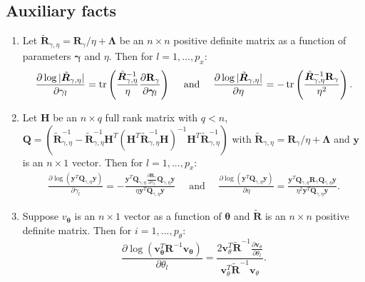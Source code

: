 \subsection{Auxiliary facts}
\begin{enumerate}[1.]
\item Let $\tilde {\bm R}_{\gamma,\eta}=\mathbf R_{\gamma}/\eta+ \bm \Lambda$ be an $n\times n$ positive definite matrix as a function of parameters $\bm \gamma$ and $\eta$.
 Then for $l=1,...,p_x$: 
\begin{align*}
\frac{\partial \log |\tilde {\bm R}_{\gamma,\eta} | }{\partial  \gamma_l}=\tr\left( \frac{\tilde {\bm R}_{\gamma,\eta}^{-1}}{\eta} \frac{\partial \mathbf R_\gamma}{\partial \bm \gamma_l} \right) \quad \mbox{ and } \quad \frac{\partial \log |\tilde {\bm R}_{\gamma,\eta} | }{\partial \eta}=-\tr\left( \frac{\tilde {\bm R}_{\gamma,\eta}^{-1} \mathbf R_\gamma}{\eta^2} \right). 
\end{align*}
\label{item:derivative_1}
\item  Let $\mathbf H$ be an $n\times q$ full rank matrix with $q<n$, $\mathbf Q=\left(\tilde {\bm R}^{-1}_{\gamma,\eta}- \tilde {\bm R}^{-1}_{\gamma,\eta} \mathbf H^T(\mathbf H^T \tilde {\bm R}^{-1}_{\gamma,\eta} \mathbf H)^{-1}   \mathbf H^T \tilde {\bm R}^{-1}_{\gamma,\eta} \right)$ with $\tilde {\bm R}_{\gamma,\eta}=\mathbf R_{\gamma}/\eta+ \bm \Lambda$ and $\mathbf y$ is an $n\times 1$ vector. Then for $l=1,...,p_x$:  
\begin{align*}
\frac{\partial \log  (\mathbf y^T \mathbf Q_{\gamma,\eta} \mathbf y)   }{\partial  \gamma_l}=-\frac{ \mathbf y^T \mathbf Q_{\gamma,\eta} \frac{\partial \mathbf R_\gamma}{\partial  \gamma_l} \mathbf Q_{\gamma,\eta} \mathbf y }{\eta \mathbf y^T \mathbf Q_{\gamma,\eta} \mathbf y } \quad \mbox{ and } \quad \frac{\partial \log  (\mathbf y^T \mathbf Q_{\gamma,\eta} \mathbf y)   }{\partial   \eta }=\frac{ \mathbf y^T \mathbf Q_{\gamma,\eta} \mathbf R_\gamma \mathbf Q_{\gamma,\eta} \mathbf y }{ \eta^2 \mathbf y^T \mathbf Q_{\gamma,\eta} \mathbf y }.
\end{align*}
\item Suppose  $v_{\bm \theta}$ is an $n\times 1$ vector as a function of $\bm \theta$ and $\mathbf {\tilde R}$ is an $n\times n$ positive definite matrix. Then for $i=1,...,p_{\theta}$: 
\[ \frac{\partial \log(\mathbf v_{\bm \theta}^T \mathbf R^{-1} \mathbf v_{\bm \theta})}{ \partial \theta_l}= \frac{2 \mathbf v_{ \theta}^T\mathbf {\tilde R}^{-1}   \frac{\partial \mathbf v_{\theta}}{\partial  \theta_l}}{\mathbf v^T_{ \theta} \mathbf {\tilde R}^{-1} \mathbf v_{ \theta}}. \] 
\label{item:derivative_2}
\end{enumerate}




